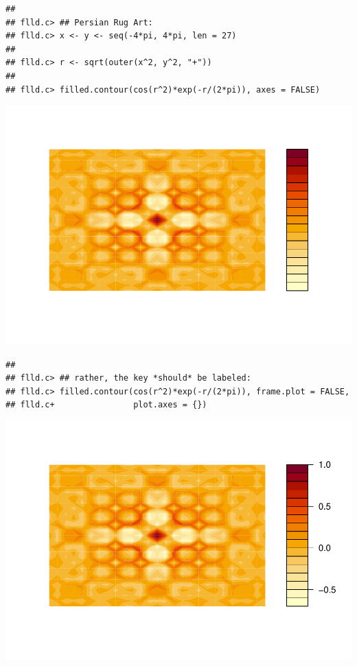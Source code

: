 \documentclass[
]{book}
\begin{document}
\begin{verbatim}
## 
## flld.c> ## Persian Rug Art:
## flld.c> x <- y <- seq(-4*pi, 4*pi, len = 27)
## 
## flld.c> r <- sqrt(outer(x^2, y^2, "+"))
## 
## flld.c> filled.contour(cos(r^2)*exp(-r/(2*pi)), axes = FALSE)
\end{verbatim}

\includegraphics{TudodoR_files/figure-latex/unnamed-chunk-145-7.pdf}

\begin{verbatim}
## 
## flld.c> ## rather, the key *should* be labeled:
## flld.c> filled.contour(cos(r^2)*exp(-r/(2*pi)), frame.plot = FALSE,
## flld.c+                plot.axes = {})
\end{verbatim}

\includegraphics{TudodoR_files/figure-latex/unnamed-chunk-145-8.pdf}
\end{document}
